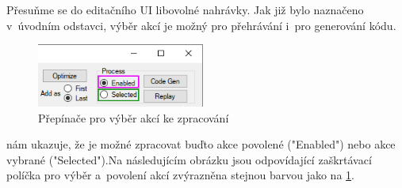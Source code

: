 \documentclass[12pt, a4paper, twoside]{article}
\begin{document}
	Přesuňme se do editačního UI libovolné nahrávky. Jak již bylo naznačeno v~úvodním odstavci, výběr akcí je možný pro přehrávání i~pro generování kódu. 
	\begin{figure}[H]
		\centering
		\includegraphics[width=0.49\textwidth]{actionsToProcess.png}
		\caption{Přepínače pro výběr akcí ke zpracování}
		\label{fig:processType}
	\end{figure}	
	 nám ukazuje, že je možné zpracovat buďto akce povolené ("Enabled") nebo akce vybrané ("Selected").\newpage Na následujícím obrázku jsou odpovídající zaškrtávací políčka pro výběr a~povolení akcí zvýrazněna stejnou barvou jako na \cref{fig:processType}.
\end{document}
